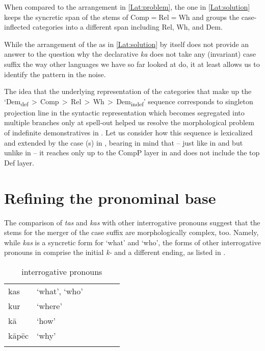 When compared to the arrangement in \ref{Lat:problem}, the one in \ref{Lat:solution} keeps the syncretic span of the stems of Comp$=$Rel$=$Wh and groups the case-inflected categories into a different span including Rel, Wh, and Dem.
\par    
While the arrangement of the  as in \ref{Lat:solution} by itself does not provide an answer to the question why the  declarative  \textit{ka} does not take any (invariant) case suffix the way other languages we have so far looked at do, it at least allows us to identify the pattern in the noise.
\par
The idea that the underlying representation of the categories that make up the `Dem\textsubscript{def}\,$>$\,Comp\,$>$\,Rel\,$>$\,Wh\,$>$\,Dem\textsubscript{indef}' sequence corresponds to singleton projection line in the syntactic representation which becomes segregated into multiple branches only at spell-out helped us resolve the morphological  problem of indefinite demonstratives in .
Let us consider how this sequence is lexicalized and extended by the case (s) in , bearing in mind that -- just like in  and  but unlike in  -- it reaches only up to the CompP layer in  and does not include the top Def layer.

\section{Refining the pronominal base}

The comparison of \textit{tas} and \textit{kas} with other interrogative pronouns suggest that the stems for the merger of the case suffix are morphologically complex, too. Namely, while \textit{kas} is a syncretic form for `what' and `who', the forms of other interrogative pronouns in  comprise the initial \textit{k-} and a different ending, as listed in . 

\begin{table}
\caption{ interrogative pronouns}
\label{Lat:wh-pronouns}
\begin{tabular}[t]{ l l l l l l }
\lsptoprule	
kas & `what', `who'\\
kur & `where'\\
k\={a} & `how'\\
k\={a}p\={e}c & `why'\\
\lspbottomrule
\end{tabular}
\end{table}

